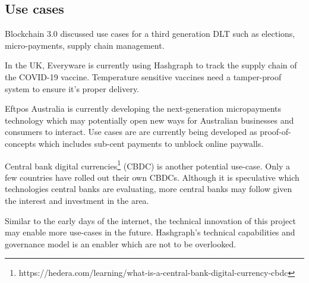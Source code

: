 

\subsection{Use cases}

Blockchain 3.0\cite{maesa2020blockchain} discussed use cases for a third generation DLT such as elections, micro-payments, supply chain management.

In the UK, Everyware is currently using Hashgraph to track the supply chain of the COVID-19 vaccine\cite{ryan2021}. Temperature sensitive vaccines need a tamper-proof system to ensure it's proper delivery.

Eftpos Australia is currently developing the next-generation micropayments technology which may potentially open new ways for Australian businesses and consumers to interact. Use cases are are currently being developed as proof-of-concepts which includes sub-cent payments to unblock online paywalls\cite{eftpos2021}.

Central bank digital currencies\footnote{https://hedera.com/learning/what-is-a-central-bank-digital-currency-cbdc} (CBDC) is another potential use-case. Only a few countries have rolled out their own CBDCs. Although it is speculative which technologies central banks are evaluating, more central banks may follow given the interest and investment in the area. 

Similar to the early days of the internet, the technical innovation of this project may enable more use-cases in the future. Hashgraph's technical capabilities and governance model is an enabler which are not to be overlooked.




